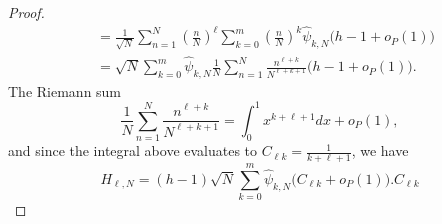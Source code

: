 \documentclass[aap,preprint]{imsart}
\begin{document}
\begin{proof}
\begin{align*}
&=  \frac{1}{\sqrt{N}} \sum_{n=1}^{N}(\tfrac{n}{N})^\ell \sum_{k=0}^m (\tfrac{n}{N})^k \widehat{\psi}_{k,N} \big( h - 1 + o_P(1) \big)   \\
&= \sqrt{N}\sum_{k=0}^m \widehat{\psi}_{k,N} \frac{1}{N} \sum_{n=1}^{N} \frac{n^{\ell + k}}{N^{\ell + k + 1}}\big( h - 1 + o_P(1)  \big).
\end{align*}
The Riemann sum
\[
\frac{1}{N} \sum_{n=1}^{N} \frac{n^{\ell + k}}{N^{\ell + k + 1}} = \int_{0}^{1}x^{k+\ell+1}dx + o_P(1),
\]
and since the integral above evaluates to $C_{\ell k} = \frac{1}{k+\ell+1}$, we have
\[
H_{\ell,N} = (h - 1)\sqrt{N}\sum_{k=0}^m \widehat{\psi}_{k,N}\big( C_{\ell k} + o_P(1)  \big).C_{\ell k}
\]
\end{proof}
\end{document}
